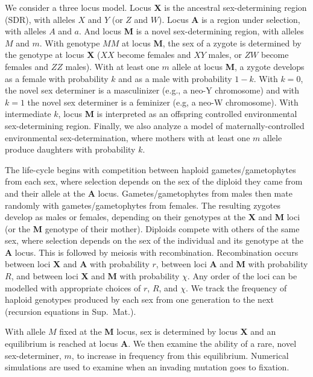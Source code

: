 \documentclass[12pt]{article}
\begin{document}
We consider a three locus model.
Locus \textbf{X} is the ancestral sex-determining region (SDR), with alleles $X$ and $Y$ (or $Z$ and $W$).
Locus \textbf{A} is a region under selection, with alleles $A$ and $a$.
And locus \textbf{M} is a novel sex-determining region, with alleles $M$ and $m$.
With genotype $MM$ at locus \textbf{M}, the sex of a zygote is determined by the genotype at locus \textbf{X} ($XX$ become females and $XY$ males, or $ZW$ become females and $ZZ$ males).
With at least one $m$ allele at locus \textbf{M}, a zygote develops as a female with probability $k$ and as a male with probability $1-k$.
With $k=0$, the novel sex determiner is a masculinizer (e.g., a neo-Y chromosome) and with $k=1$ the novel sex determiner is a feminizer (e.g, a neo-W chromosome).
With intermediate $k$, locus \textbf{M} is interpreted as an offspring controlled environmental sex-determining region.
Finally, we also analyze a model of maternally-controlled environmental sex-determination, where mothers with at least one $m$ allele produce daughters with probability $k$. 

The life-cycle begins with competition between haploid gametes/gametophytes from each sex, where selection depends on the sex of the diploid they came from and their allele at the \textbf{A} locus.
Gametes/gametophytes from males then mate randomly with gametes/gametophytes from females.
The resulting zygotes develop as males or females, depending on their genotypes at the \textbf{X} and \textbf{M} loci (or the \textbf{M} genotype of their mother).
Diploids compete with others of the same sex, where selection depends on the sex of the individual and its genotype at the \textbf{A} locus.
This is followed by meiosis with recombination. 
Recombination occurs between loci \textbf{X} and \textbf{A} with probability $r$, between loci \textbf{A} and \textbf{M} with probability $R$, and between loci \textbf{X} and \textbf{M} with probability $\chi$. %
Any order of the loci can be modelled with appropriate choices of $r$, $R$, and $\chi$.
We track the frequency of haploid genotypes produced by each sex from one generation to the next (recursion equations in Sup.\ Mat.).

With allele $M$ fixed at the \textbf{M} locus, sex is determined by locus \textbf{X} and an equilibrium is reached at locus \textbf{A}. %
We then examine the ability of a rare, novel sex-determiner, $m$, to increase in frequency from this equilibrium.
Numerical simulations are used to examine when an invading mutation goes to fixation.
\end{document}
